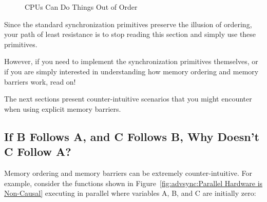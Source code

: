 \begin{figure}[htb]
\begin{center}
\end{center}
\caption{CPUs Can Do Things Out of Order}
\end{figure}

Since the standard synchronization primitives preserve the illusion of
ordering, your path of least resistance is to stop reading
this section and simply use these primitives.

However, if you need to implement the synchronization primitives
themselves, or if you are simply interested in understanding how memory
ordering and memory barriers work, read on!

The next sections present counter-intuitive scenarios that you might
encounter when using explicit memory barriers.

\subsection{If B Follows A, and C Follows B, Why Doesn't C Follow A?}
\label{sec:advsync:If B Follows A, and C Follows B, Why Doesn't C Follow A?}

Memory ordering and memory barriers can be extremely counter-intuitive.
For example, consider the functions shown in
Figure~\ref{fig:advsync:Parallel Hardware is Non-Causal}
executing in parallel
where variables A, B, and C are initially zero:

